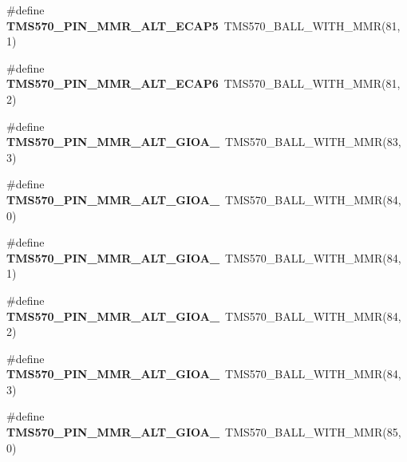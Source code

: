 \begin{DoxyCompactItemize}
\#define {\bfseries T\+M\+S570\+\_\+\+P\+I\+N\+\_\+\+M\+M\+R\+\_\+\+A\+L\+T\+\_\+\+E\+C\+A\+P5}~T\+M\+S570\+\_\+\+B\+A\+L\+L\+\_\+\+W\+I\+T\+H\+\_\+\+M\+MR(81, 1)
\item 
\mbox{\label{tms570lc4357-pins_8h_a9efcd39c79d3edc6c317d77c121a20a5}} 
\#define {\bfseries T\+M\+S570\+\_\+\+P\+I\+N\+\_\+\+M\+M\+R\+\_\+\+A\+L\+T\+\_\+\+E\+C\+A\+P6}~T\+M\+S570\+\_\+\+B\+A\+L\+L\+\_\+\+W\+I\+T\+H\+\_\+\+M\+MR(81, 2)
\item 
\mbox{\label{tms570lc4357-pins_8h_a9aba6c235a926180e1e56620536f4fb4}} 
\#define {\bfseries T\+M\+S570\+\_\+\+P\+I\+N\+\_\+\+M\+M\+R\+\_\+\+A\+L\+T\+\_\+\+G\+I\+O\+A\+\_}~T\+M\+S570\+\_\+\+B\+A\+L\+L\+\_\+\+W\+I\+T\+H\+\_\+\+M\+MR(83, 3)
\item 
\mbox{\label{tms570lc4357-pins_8h_a6d696cdddf410cc17396835db8884d33}} 
\#define {\bfseries T\+M\+S570\+\_\+\+P\+I\+N\+\_\+\+M\+M\+R\+\_\+\+A\+L\+T\+\_\+\+G\+I\+O\+A\+\_}~T\+M\+S570\+\_\+\+B\+A\+L\+L\+\_\+\+W\+I\+T\+H\+\_\+\+M\+MR(84, 0)
\item 
\mbox{\label{tms570lc4357-pins_8h_ad1cb913578763c26e92b79d7f0ff39bc}} 
\#define {\bfseries T\+M\+S570\+\_\+\+P\+I\+N\+\_\+\+M\+M\+R\+\_\+\+A\+L\+T\+\_\+\+G\+I\+O\+A\+\_}~T\+M\+S570\+\_\+\+B\+A\+L\+L\+\_\+\+W\+I\+T\+H\+\_\+\+M\+MR(84, 1)
\item 
\mbox{\label{tms570lc4357-pins_8h_aed2a545c2708b0f4ba1d3afe4054218a}} 
\#define {\bfseries T\+M\+S570\+\_\+\+P\+I\+N\+\_\+\+M\+M\+R\+\_\+\+A\+L\+T\+\_\+\+G\+I\+O\+A\+\_}~T\+M\+S570\+\_\+\+B\+A\+L\+L\+\_\+\+W\+I\+T\+H\+\_\+\+M\+MR(84, 2)
\item 
\mbox{\label{tms570lc4357-pins_8h_ae74f049f4cac292d37015de3c49bf4f0}} 
\#define {\bfseries T\+M\+S570\+\_\+\+P\+I\+N\+\_\+\+M\+M\+R\+\_\+\+A\+L\+T\+\_\+\+G\+I\+O\+A\+\_}~T\+M\+S570\+\_\+\+B\+A\+L\+L\+\_\+\+W\+I\+T\+H\+\_\+\+M\+MR(84, 3)
\item 
\mbox{\label{tms570lc4357-pins_8h_a19056541044eb338a7858cc1d3d7bcbb}} 
\#define {\bfseries T\+M\+S570\+\_\+\+P\+I\+N\+\_\+\+M\+M\+R\+\_\+\+A\+L\+T\+\_\+\+G\+I\+O\+A\+\_}~T\+M\+S570\+\_\+\+B\+A\+L\+L\+\_\+\+W\+I\+T\+H\+\_\+\+M\+MR(85, 0)

\end{DoxyCompactItemize}
